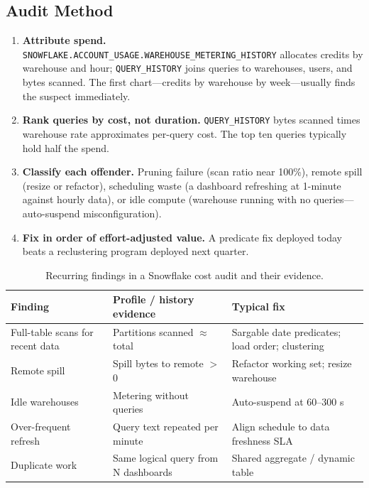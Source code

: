 \subsection{Audit Method}
\begin{enumerate}
    \item \textbf{Attribute spend.} \texttt{SNOWFLAKE.ACCOUNT\_USAGE.WAREHOUSE\_METERING\_HISTORY} allocates credits by warehouse and hour; \texttt{QUERY\_HISTORY} joins queries to warehouses, users, and bytes scanned. The first chart---credits by warehouse by week---usually finds the suspect immediately.
    \item \textbf{Rank queries by cost, not duration.} \texttt{QUERY\_HISTORY} bytes scanned times warehouse rate approximates per-query cost. The top ten queries typically hold half the spend.
    \item \textbf{Classify each offender.} Pruning failure (scan ratio near 100\%), remote spill (resize or refactor), scheduling waste (a dashboard refreshing at 1-minute against hourly data), or idle compute (warehouse running with no queries---auto-suspend misconfiguration).
    \item \textbf{Fix in order of effort-adjusted value.} A predicate fix deployed today beats a reclustering program deployed next quarter.
\end{enumerate}

\begin{table}[H]
\centering
\small
\begin{tabular}{@{}p{4.2cm}p{4.6cm}p{4.6cm}@{}}
\toprule
\textbf{Finding} & \textbf{Profile / history evidence} & \textbf{Typical fix} \\
\midrule
Full-table scans for recent data & Partitions scanned $\approx$ total & Sargable date predicates; load order; clustering \\
Remote spill & Spill bytes to remote $>$ 0 & Refactor working set; resize warehouse \\
Idle warehouses & Metering without queries & Auto-suspend at 60--300 s \\
Over-frequent refresh & Query text repeated per minute & Align schedule to data freshness SLA \\
Duplicate work & Same logical query from N dashboards & Shared aggregate / dynamic table \\
\bottomrule
\end{tabular}
\caption{Recurring findings in a Snowflake cost audit and their evidence.}
\label{tab:chapter10-cost-audit}
\end{table}

